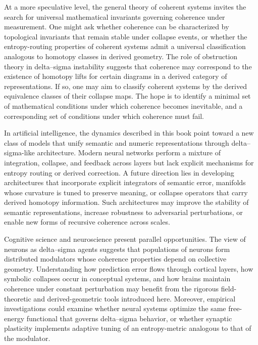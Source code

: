 At a more speculative level, the general theory of coherent systems invites the search for universal mathematical invariants governing coherence under measurement. One might ask whether coherence can be characterized by topological invariants that remain stable under collapse events, or whether the entropy-routing properties of coherent systems admit a universal classification analogous to homotopy classes in derived geometry. The role of obstruction theory in delta–sigma instability suggests that coherence may correspond to the existence of homotopy lifts for certain diagrams in a derived category of representations. If so, one may aim to classify coherent systems by the derived equivalence classes of their collapse maps. The hope is to identify a minimal set of mathematical conditions under which coherence becomes inevitable, and a corresponding set of conditions under which coherence must fail.

In artificial intelligence, the dynamics described in this book point toward a new class of models that unify semantic and numeric representations through delta–sigma-like architecture. Modern neural networks perform a mixture of integration, collapse, and feedback across layers but lack explicit mechanisms for entropy routing or derived correction. A future direction lies in developing architectures that incorporate explicit integrators of semantic error, manifolds whose curvature is tuned to preserve meaning, or collapse operators that carry derived homotopy information. Such architectures may improve the stability of semantic representations, increase robustness to adversarial perturbations, or enable new forms of recursive coherence across scales.

Cognitive science and neuroscience present parallel opportunities. The view of neurons as delta–sigma agents suggests that populations of neurons form distributed modulators whose coherence properties depend on collective geometry. Understanding how prediction error flows through cortical layers, how symbolic collapses occur in conceptual systems, and how brains maintain coherence under constant perturbation may benefit from the rigorous field-theoretic and derived-geometric tools introduced here. Moreover, empirical investigations could examine whether neural systems optimize the same free-energy functional that governs delta–sigma behavior, or whether synaptic plasticity implements adaptive tuning of an entropy-metric analogous to that of the modulator.

